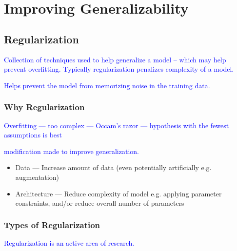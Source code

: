 \section{Improving Generalizability}

\subsection{Regularization}

\textcolor{blue}{Collection of techniques used to help generalize a model -- which may help prevent overfitting. Typically regularization penalizes complexity of a model.}


\textcolor{blue}{Helps prevent the model from memorizing noise in the training data.}


\subsubsection{Why Regularization}

\textcolor{blue}{Overfitting --- too complex --- Occam's razor --- hypothesis with the fewest assumptions is best}

\textcolor{blue}{modification made to improve generalization.}

\begin{itemize}
	\item Data --- Increase amount of data (even potentially artificially e.g. augmentation)
	\item Architecture --- Reduce complexity of model e.g. applying parameter constraints, and/or reduce overall number of parameters
\end{itemize}


\subsubsection{Types of Regularization}

\textcolor{blue}{Regularization is an active area of research.}

